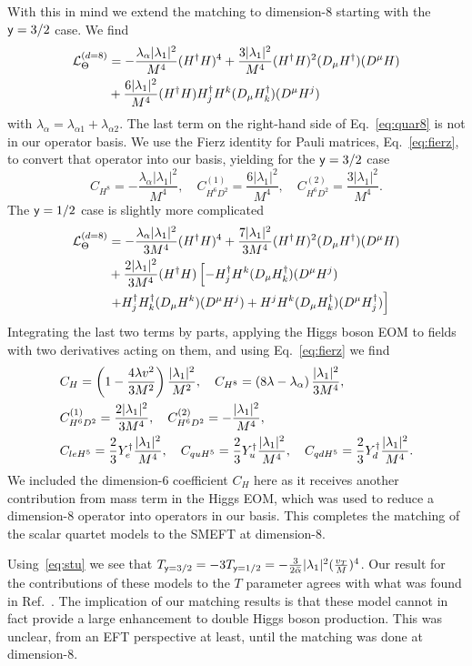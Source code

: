 With this in mind we extend the matching to dimension-8 starting with the $\mathsf{y} = 3/2$ case.
We find
\begin{align}
\label{eq:quar8}
\mathcal{L}_\Theta^{(d=8)} &= - \frac{\lambda_\alpha |\lambda_1|^2}{M^4} (H^\dag H)^4 + \frac{3 |\lambda_1|^2}{M^4} (H^\dag H)^2 (D_\mu H^\dag) (D^\mu H) \nonumber\\ 
&+ \frac{6 |\lambda_1|^2}{M^4} (H^\dag H) H^\dag_j H^k (D_\mu H^\dag_k) (D^\mu H^j)
\end{align}
with $\lambda_\alpha =  \lambda_{\alpha1} +  \lambda_{\alpha2}$.
The last term on the right-hand side of Eq.~\eqref{eq:quar8} is not in our operator basis.
We use the Fierz identity for Pauli matrices, Eq.~\eqref{eq:fierz}, to convert that operator into our basis, yielding for the $\mathsf{y} = 3/2$ case
\begin{equation}
C_{H^8} = - \frac{\lambda_\alpha |\lambda_1|^2}{M^4}, \quad C_{H^6D^2}^{(1)} = \frac{6 |\lambda_1|^2}{M^4}, \quad C_{H^6D^2}^{(2)} = \frac{3 |\lambda_1|^2}{M^4} .
\end{equation}
The $\mathsf{y} = 1/2$ case is slightly more complicated
\begin{align}
\mathcal{L}_\Theta^{(d=8)} &= - \frac{\lambda_\alpha |\lambda_1|^2}{3M^4} (H^\dag H)^4 + \frac{7|\lambda_1|^2}{3M^4} (H^\dag H)^2 (D_\mu H^\dag) (D^\mu H) \nonumber\\ 
&+ \frac{2 |\lambda_1|^2}{3M^4} (H^\dag H) \left[-H^\dag_j H^k (D_\mu H^\dag_k) (D^\mu H^j)\right. \nonumber\\ 
&\left. + H^\dag_j H^\dag_k (D_\mu H^k) (D^\mu H^j) + H^j H^k (D_\mu H^\dag_k) (D^\mu H^\dag_j) \right]
\end{align}
Integrating the last two terms by parts, applying the Higgs boson EOM to fields with two derivatives acting on them, and using Eq.~\eqref{eq:fierz} we find
\begin{align}
&C_H = \left(1 - \frac{4 \lambda v^2}{3M^2}\right) \frac{|\lambda_1|^2}{M^2},\quad C_{H^8} = \left(8 \lambda - \lambda_\alpha \right) \frac{|\lambda_1|^2}{3M^4},\nonumber\\ 
&C_{H^6D^2}^{(1)} = \frac{2 |\lambda_1|^2}{3M^4},\quad C_{H^6D^2}^{(2)} = - \frac{|\lambda_1|^2}{M^4}, \nonumber\\ 
&C_{leH^5} =  \frac{2}{3} Y_e^\dag \frac{ |\lambda_1|^2}{ M^4},\quad C_{quH^5} = \frac{2}{3} Y_u^\dag \frac{ |\lambda_1|^2}{ M^4},\quad C_{qdH^5} =  \frac{2}{3} Y_d^\dag \frac{ |\lambda_1|^2}{M^4} .
\end{align}
We included the dimension-6 coefficient $C_H$ here as it receives another contribution from mass term in the Higgs EOM, which was used to reduce a dimension-8 operator into operators in our basis. 
This completes the matching of the scalar quartet models to the SMEFT at dimension-8.

Using~\eqref{eq:stu} we see that $T_{\mathsf{y}=3/2} = - 3 T_{\mathsf{y}=1/2} = - \frac{3}{2\bar\alpha} |\lambda_1|^2 (\tfrac{v_T}{M})^4$.
Our result for the contributions of these models to the $T$ parameter agrees with what was found in Ref.~\cite{Dawson:2017vgm}.
The implication of our matching results is that these model cannot in fact provide a large enhancement to double Higgs boson production.
This was unclear, from an EFT perspective at least, until the matching was done at dimension-8.
